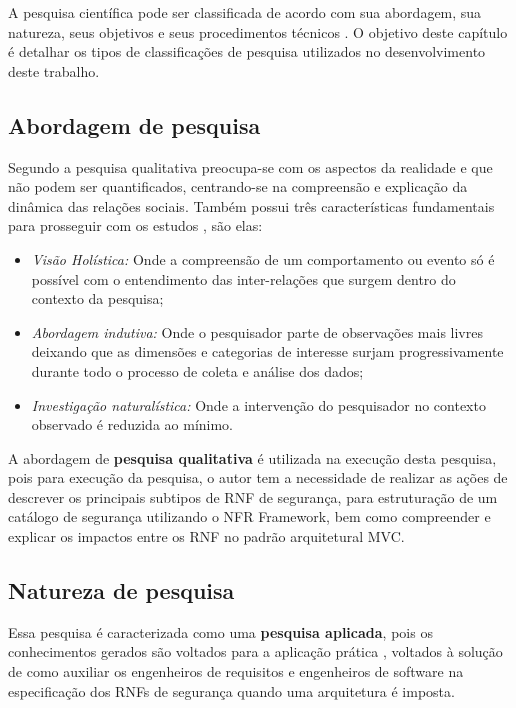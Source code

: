 A pesquisa científica pode ser classificada de acordo com sua abordagem, sua natureza, seus objetivos e seus procedimentos técnicos \cite{gerhardt2009metodos}. O objetivo deste capítulo é detalhar os tipos de classificações de pesquisa utilizados no desenvolvimento deste trabalho. 

\subsection{Abordagem de pesquisa}

Segundo \cite{gerhardt2009metodos} a pesquisa qualitativa preocupa-se com os aspectos da realidade e que não podem ser quantificados, centrando-se na compreensão e explicação da dinâmica das relações sociais. Também possui três características fundamentais para prosseguir com os estudos \cite{mazzotti1991planejamento}, são elas:

\begin{itemize}
	\item \textit{Visão Holística:} Onde a compreensão de um comportamento ou evento só é possível com o entendimento das inter-relações que surgem dentro do contexto da pesquisa;
	\item \textit{Abordagem indutiva:} Onde o pesquisador parte de observações mais livres deixando que as dimensões e categorias de interesse surjam progressivamente durante todo o processo de coleta e análise dos dados;
	\item \textit{Investigação naturalística:} Onde a intervenção do pesquisador no contexto observado é reduzida ao mínimo.
\end{itemize}

A abordagem de \textbf{pesquisa qualitativa} é utilizada na execução desta pesquisa, pois para execução da pesquisa, o autor tem a necessidade de realizar as ações de descrever os principais subtipos de RNF de segurança, para estruturação de um catálogo de segurança utilizando o NFR Framework, bem como compreender e explicar os impactos entre os RNF no padrão arquitetural MVC. 

\subsection{Natureza de pesquisa}

Essa pesquisa é caracterizada como uma \textbf{pesquisa aplicada}, pois os conhecimentos gerados são voltados para a aplicação prática \cite{gerhardt2009metodos}, voltados à solução de como auxiliar os engenheiros de requisitos e engenheiros de software na especificação dos RNFs de segurança quando uma arquitetura é imposta. 

